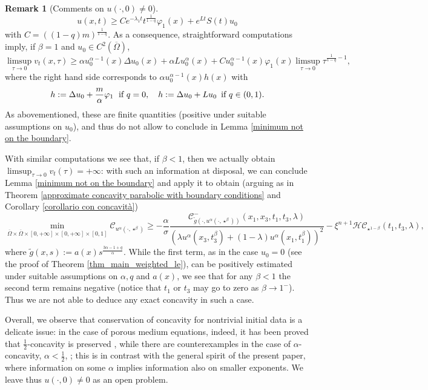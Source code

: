 \documentclass[11pt, reqno]{amsart}
\theoremstyle{definition}
\newtheorem{remark}[lemma]{Remark}
\numberwithin{equation}{section}
\newcommand{\Omegabar}{\overline{\Omega}}
\newcommand{\mc}[1]{\mathcal{#1}}
\begin{document}
\begin{remark}[Comments on $u(\cdot, 0) \neq 0$]
	$$u(x,t) \geq C e^{-\lambda_1 t} t^{\frac{1}{1-q}}\varphi_1(x) + e^{Lt} S(t) u_0$$
	with $C=((1-q) m)^{\frac{1}{1-q}}$.
	As a consequence, straightforward computations imply, if $\beta=1$ and $u_0 \in C^2(\Omegabar)$, 
	$$\limsup_{\tau\to 0} v_t(x,\tau) \geq \alpha u_0^{\alpha-1}(x) \Delta u_0(x)+ \alpha L u_0^{\alpha}(x) + C u_0^{\alpha-1}(x) \varphi_1(x) \limsup_{\tau \to 0} \tau^{\frac{1}{1-q}-1}, $$
	where the right hand side corresponds to $\alpha u_0^{\alpha-1}(x) h(x)$ with
	$$h := \Delta u_0+ \frac{m}{\alpha} \varphi_1 \; \hbox{ if $q=0$}, \quad h :=\Delta u_0 + L u_0 \, \hbox{ if $q \in (0,1)$}.$$
	As abovementioned, these are finite quantities (positive under suitable assumptions on $u_0$), and thus do not allow to conclude in Lemma \ref{minimum not on the boundary}. 
	
	With similar computations we see that, if $\beta<1$, then we actually obtain $\limsup_{\tau \to 0} v_t(\tau) = +\infty$: with such an information at disposal, we can conclude Lemma \ref{minimum not on the boundary} and apply it to obtain (arguing as in Theorem \ref{approximate concavity parabolic with boundary conditions} and Corollary \ref{corollario con concavità})
		$$\min_{\Omegabar\times \Omegabar\times[0,+\infty]\times [0,+\infty]\times[0,1]}\mathcal{C}_{u^\alpha(\cdot, \star^{\beta})} \geq -\frac{\alpha}{\sigma}\frac{\mathcal{C}^-_{\tilde{g}(\cdot, u^{\alpha}(\cdot,\star^{\beta}) ) }(x_{1},x_{3},t_{1},t_{3},\lambda)}{(\lambda u^\alpha(x_{3},t_{3}^{\beta})
		+(1-\lambda)u^\alpha(x_{1},t_{1}^{\beta})
		)^2} - \xi^{n+1}\mc{HC}_{\star^{1-\beta}}(t_{1},t_{3},\lambda),$$
	where $\tilde{g}(x,s):=a(x) s^{\frac{3\alpha-1+q}{\alpha}} $. 
		While the first term, as in the case $u_0=0$ (see the proof of Theorem \ref{thm_main_weighted_le}), can be positively estimated under suitable assumptions on $\alpha, q$ and $a(x)$, we see that for any $\beta<1$ the second term remains negative (notice that $t_1$ or $t_3$ may go to zero as $\beta \to 1^-$). 
	Thus we are not able to deduce any exact concavity in such a case.
	
	Overall, we observe that conservation of concavity for nontrivial initial data is a delicate issue: in the case of porous medium equations, 
	indeed, it has been proved that $\frac{1}{2}$-concavity is preserved \cite{lee2008parabolic}, while there are counterexamples in the case of $\alpha$-concavity, $\alpha<\frac{1}{2}$, \cite{ChauWeinkove}; this is in contrast with the general spirit of the present paper, where information on some $\alpha$ implies information also on smaller exponents. 
We leave thus $u(\cdot, 0)\neq 0$ as an open problem.
\end{remark}
\end{document}
